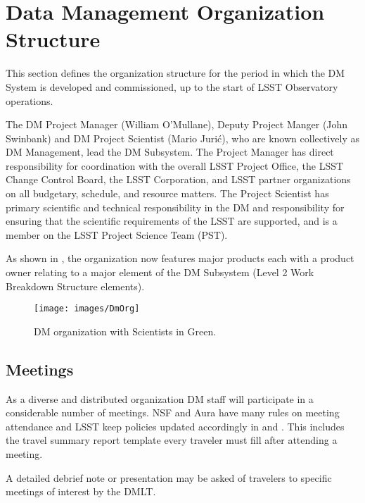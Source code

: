 \section{Data Management Organization Structure}

This section defines the organization structure for the period in which the DM System is developed and commissioned, up to the start of LSST Observatory operations.

The DM Project Manager (William O'Mullane), Deputy Project Manger (John Swinbank) and DM Project Scientist (Mario Juri\'c), who are known collectively as DM Management, lead the DM Subsystem.
The Project Manager has direct responsibility for coordination with the overall LSST Project Office, the LSST Change Control Board, the LSST Corporation, and LSST partner organizations on all budgetary, schedule, and resource matters.
The Project Scientist has primary scientific and technical responsibility in the DM and responsibility for ensuring that the scientific requirements of the LSST are supported, and is a member on the LSST Project Science Team (PST).

As shown in , the organization now features  major products  each with a product owner
relating to a major element of the DM Subsystem (Level 2 Work Breakdown Structure elements).

\begin{figure}[htbp]
\begin{center}
 \texttt{[image: images/DmOrg]}
\caption{DM organization with Scientists in Green. \label{fig:dmorg}}
\end{center}
\end{figure}


\subsection {Meetings } \label{sect:meetings}
As a diverse and distributed organization DM staff will participate in a considerable number of meetings.
NSF and Aura have many rules on meeting attendance and LSST keep policies updated accordingly in  and . This includes the travel summary report template  every traveler must fill after attending a meeting.

A detailed debrief note or presentation may be asked of travelers to specific meetings of interest by the DMLT.

